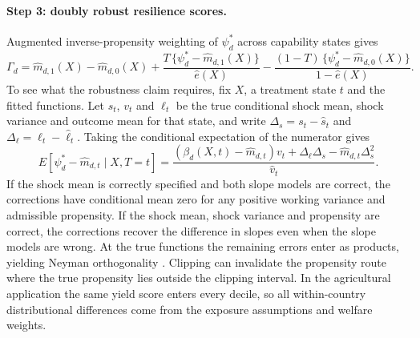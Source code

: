 \paragraph{Step 3: doubly robust resilience scores.} Augmented inverse-propensity weighting
of $\psi^{*}_d$ across capability states gives
\begin{equation}\label{eq:gamma}
\Gamma_d = \hat m_{d,1}(X) - \hat m_{d,0}(X)
 + \frac{T\,\{\psi^{*}_d-\hat m_{d,1}(X)\}}{\hat e(X)}
 - \frac{(1-T)\,\{\psi^{*}_d-\hat m_{d,0}(X)\}}{1-\hat e(X)} .
\end{equation}
To see what the robustness claim requires, fix $X$, a treatment state $t$ and the fitted
functions. Let $s_t$, $v_t$ and $\ell_t$ be the true conditional shock mean, shock variance and
outcome mean for that state, and write $\Delta_s=s_t-\hat s_t$ and
$\Delta_\ell=\ell_t-\hat\ell_t$. Taking the conditional expectation of the numerator gives
\begin{equation}\label{eq:slope_remainder}
E[\psi_d^*-\hat m_{d,t}\mid X,T=t]
= \frac{(\beta_d(X,t)-\hat m_{d,t})v_t
       +\Delta_\ell\Delta_s-\hat m_{d,t}\Delta_s^2}{\hat v_t}.
\end{equation}
If the shock mean is correctly specified and both slope models are correct, the corrections
have conditional mean zero for any positive working variance and admissible propensity.
If the shock mean, shock variance and propensity are correct, the corrections recover the
difference in slopes even when the slope models are wrong. At the true functions the remaining
errors enter as products, yielding Neyman orthogonality
\citep{chernozhukov2018,semenova2021}. Clipping can invalidate the propensity route where the
true propensity lies outside the clipping interval. In the agricultural application the
same yield score enters every decile, so all within-country distributional differences come
from the exposure assumptions and welfare weights.

